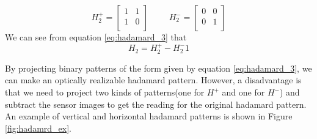 \begin{equation}
H_2^+ = \begin{bmatrix} 
       1 & 1 \\
	   1 & 0 \\
    \end{bmatrix}
   \hspace{1cm}
   H_2^- = \begin{bmatrix} 
       0 & 0 \\
	   0 & 1 \\
    \end{bmatrix}
    \label{eq:hadamard_3}
\end{equation}
We can see from equation \ref{eq:hadamard_3} that 
\begin{equation}
H_2 = H_2^+ - H_2^-1
\label{eq:hadamard_4}
\end{equation}

By projecting binary patterns of the form given by equation \ref{eq:hadamard_3}, we can make an optically realizable hadamard pattern. However, a disadvantage is that we need to project two kinds of patterns(one for $H^+$ and one for $H^-$) and subtract the sensor images to get the reading for the original hadamard pattern. An example of vertical and horizontal hadamard patterns is shown in Figure \ref{fig:hadamrd_ex}. 

